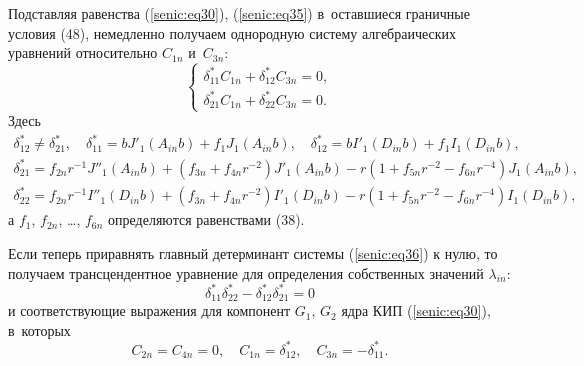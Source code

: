 Подставляя равенства (\ref{senic:eq30}), (\ref{senic:eq35}) в~оставшиеся граничные условия (48), 
немедленно получаем однородную систему алгебраических уравнений относительно 
$C_{1n} $ и~$C_{3n} $:
\begin{equation}
\label{senic:eq36}
\left\{ {\begin{array}{l}
 \delta _{11}^\ast C_{1n} + \delta _{12}^\ast C_{3n} = 0, \\ 
 \delta _{21}^\ast C_{1n} + \delta _{22}^\ast C_{3n} = 0. 
 \end{array}} \right.
\end{equation}
Здесь 
\begin{equation}
 \begin{array}{c}
 \delta _{12}^\ast \ne \delta _{21}^\ast ,\quad  
\delta _{11}^\ast = b{J}'_1 \left( {A_{in} b} \right) + f_1 J_1 \left( 
{A_{in} b} \right),\quad \delta _{12}^\ast = b{I}'_1 \left( {D_{in} b} \right) + 
f_1 I_1 \left( {D_{in} b} \right),\\
\delta _{21}^\ast = f_{2n} r^{ - 1}{J}''_1 \left( {A_{in} b} \right) + 
\left( {f_{3n} + f_{4n} r^{ - 2}} \right){J}'_1 \left( {A_{in} b} \right) - 
r\left( {1 + f_{5n} r^{ - 2} - f_{6n} r^{ - 4}} \right)J_1 \left( {A_{in} b} 
\right),\\
\delta _{22}^\ast = f_{2n} r^{ - 1}{I}''_1 \left( {D_{in} b} \right) + 
\left( {f_{3n} + f_{4n} r^{ - 2}} \right){I}'_1 \left( {D_{in} b} \right) - 
r\left( {1 + f_{5n} r^{ - 2} - f_{6n} r^{ - 4}} \right)I_1 \left( {D_{in} b} 
\right),
 \end{array}
\label{senic:eq37}
\end{equation}
а $f_1$, $f_{2n}$, \dots, $f_{6n}$ определяются равенствами (38).

Если теперь приравнять главный детерминант системы (\ref{senic:eq36}) к нулю, то получаем 
трансцендентное уравнение для определения собственных значений $\lambda _{in}$:
\begin{equation}
\label{senic:eq38}
\delta _{11}^\ast \delta _{22}^\ast - \delta _{12}^\ast \delta _{21}^\ast = 0
\end{equation}
и соответствующие выражения для компонент $G_1$, $G_2 $ ядра КИП (\ref{senic:eq30}), в~которых
\begin{equation}
\label{senic:eq39}
C_{2n} = C_{4n} = 0,\quad C_{1n} = \delta _{12}^\ast, \quad C_{3n} = - \delta _{11}^\ast .
\end{equation}

